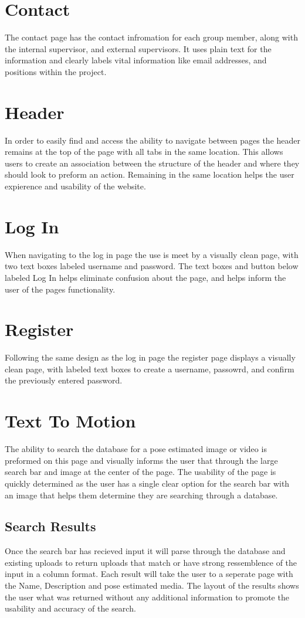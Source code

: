 \documentclass{scrreprt}
\begin{document}
\section{Contact}
The contact page has the contact infromation for each group member, along with the internal supervisor, and external supervisors. It uses plain text for the information and clearly labels vital information like email addresses, and positions within the project.

\section{Header}
In order to easily find and access the ability to navigate between pages the header remains at the top of the page with all tabs in the same location. This allows users to create an association between the structure of the header and where they should look to preform an action. Remaining in the same location helps the user expierence and usability of the website.

\section{Log In}
When navigating to the log in page the use is meet by a visually clean page, with two text boxes labeled username and password. The text boxes and button below labeled Log In helps eliminate confusion about the page, and helps inform the user of the pages functionality.

\section{Register}
Following the same design as the log in page the register page displays a visually clean page, with labeled text boxes to create a username, passowrd, and confirm the previously entered password.

\section{Text To Motion}
The ability to search the database for a pose estimated image or video is preformed on this page and visually informs the user that through the large search bar and image at the center of the page. The usability of the page is quickly determined as the user has a single clear option for the search bar with an image that helps them determine they are searching through a database.

\subsection{Search Results}
Once the search bar has recieved input it will parse through the database and existing uploads to return uploads that match or have strong ressemblence of the input in a column format. Each result will take the user to a seperate page with the Name, Description and pose estimated media. The layout of the results shows the user what was returned without any additional information to promote the usability and accuracy of the search.
\end{document}
